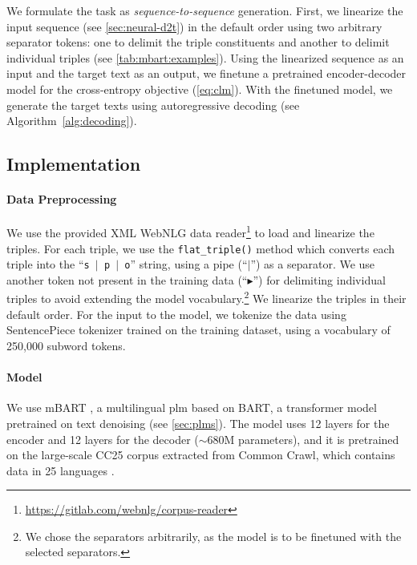 We formulate the task as \emph{sequence-to-sequence} generation. First, we linearize the input sequence (see \autoref{sec:neural-d2t}) in the default order using two arbitrary separator tokens: one to delimit the triple constituents and another to delimit individual triples (see \autoref{tab:mbart:examples}). Using the linearized sequence as an input and the target text as an output, we finetune a pretrained encoder-decoder model for the cross-entropy objective (\autoref{eq:clm}). With the finetuned model, we generate the target texts using autoregressive decoding (see Algorithm~\ref{alg:decoding}).

% 


\subsection{Implementation}
\label{sec:finetuning:implementation}
\paragraph{Data Preprocessing} We use the provided XML WebNLG data reader\footnote{\url{https://gitlab.com/webnlg/corpus-reader}} to load and linearize the triples. For each triple, we use the \texttt{flat\_triple()} method which converts each triple into the ``\texttt{s $\vert$ p $\vert$ o}'' string, using a pipe (``$\vert$'') as a separator. We use another token not present in the training data (``$\blacktriangleright$'') for delimiting individual triples to avoid extending the model vocabulary.\footnote{We chose the separators arbitrarily, as the model is to be finetuned with the selected separators.} We linearize the triples in their default order. For the input to the model, we tokenize the data using SentencePiece tokenizer \citep{kudo2018sentencepiece} trained on the training dataset, using a vocabulary of 250,000 subword tokens.

\paragraph{Model}
We use mBART \cite{liuMultilingualDenoisingPretraining2020}, a multilingual \ac{plm} based on BART, a transformer model pretrained on text denoising (see \autoref{sec:plms}).
The model uses 12 layers for the encoder and 12 layers for the decoder ($\sim$680M parameters), and it is pretrained on the large-scale CC25 corpus extracted from Common Crawl, which contains data in 25 languages \citep{wenzek2020ccnet}.



